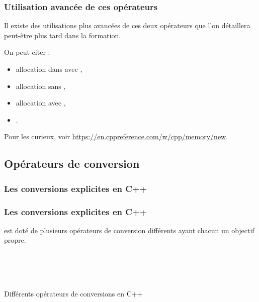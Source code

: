\documentclass{cppcourses}
\begin{document}
\begin{frame}

\frametitle{Utilisation avancée de ces opérateurs}

\begin{remark}

Il existe des utilisations plus avancées de ces deux opérateurs que l'on détaillera peut-être plus tard dans la formation.

On peut citer :

\begin{itemize}
    \item<2-> allocation dans  avec ,
    \item<3-> allocation sans ,
    \item<4-> allocation avec ,
    \item<5-> .
\end{itemize}

\end{remark}

Pour les curieux, voir \url{https://en.cppreference.com/w/cpp/memory/new}.

\end{frame}

\subsection{Opérateurs de conversion}

\subsubsection{Les conversions explicites en C++}

\begin{frame}

\frametitle{Les conversions explicites en C++}

 est doté de plusieurs opérateurs de conversion différents ayant chacun un objectif propre.

\begin{myfigure}
 \\
 \\
 \\
\caption{Différents opérateurs de conversions en C++}
\end{myfigure}

\end{frame}
\end{document}
